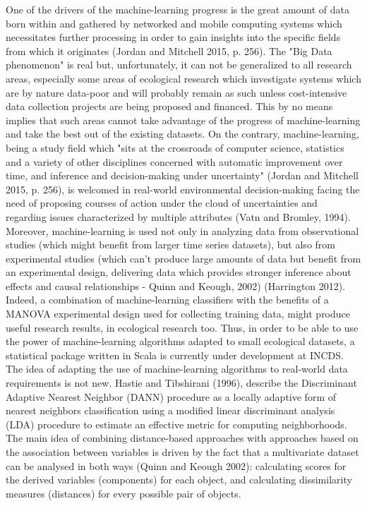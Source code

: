 \documentclass[journal]{IEEEtran}
\begin{document}
One of the drivers of the machine-learning progress is the great amount of data born within and gathered by networked and mobile computing systems which necessitates further processing in order to gain insights into the specific fields from which it originates (Jordan and Mitchell 2015, p. 256). 
The "Big Data phenomenon" is real but, unfortunately, it can not be generalized to all research areas, especially some areas of ecological research which investigate systems which are by nature data-poor and will probably remain as such unless cost-intensive data collection projects are being proposed and financed. This by no means implies that such areas cannot take advantage of the progress of machine-learning and take the best out of the existing datasets.        
On the contrary, machine-learning, being a study field which "sits at the crossroads of computer science, statistics and a variety of other disciplines concerned with automatic improvement over time, and inference and decision-making under uncertainty" (Jordan and Mitchell 2015, p. 256), is welcomed in real-world environmental decision-making facing the need of proposing courses of action under the cloud of uncertainties and regarding issues characterized by multiple attributes (Vatn and Bromley, 1994).   
Moreover, machine-learning is used not only in analyzing data from observational studies (which might benefit from larger time series datasets), but also from experimental studies (which can't produce large amounts of data but benefit from an experimental design, delivering data which provides stronger inference about effects and causal relationships - Quinn and Keough, 2002) (Harrington 2012).
Indeed, a combination of machine-learning classifiers with the benefits of a MANOVA experimental design used for collecting training data, might produce useful research results, in ecological research too. Thus, in order to be able to use the power of machine-learning algorithms adapted to small ecological datasets, a statistical package written in Scala is currently under development at INCDS.\\


The idea of adapting the use of machine-learning algorithms to real-world data requirements is not new. 
Hastie and Tibshirani (1996), describe the Discriminant Adaptive Nearest Neighbor (DANN) procedure as a locally adaptive form of nearest neighbors classification using a modified linear discriminant analysis (LDA) procedure to estimate an effective metric for computing neighborhoods.
The main idea of combining distance-based approaches with approaches based on the association between variables is driven by the fact that a multivariate dataset can be analysed in both ways (Quinn and Keough 2002): calculating scores for the derived variables (components) for each object, and calculating dissimilarity measures (distances) for every possible pair of objects.\\
\end{document}
